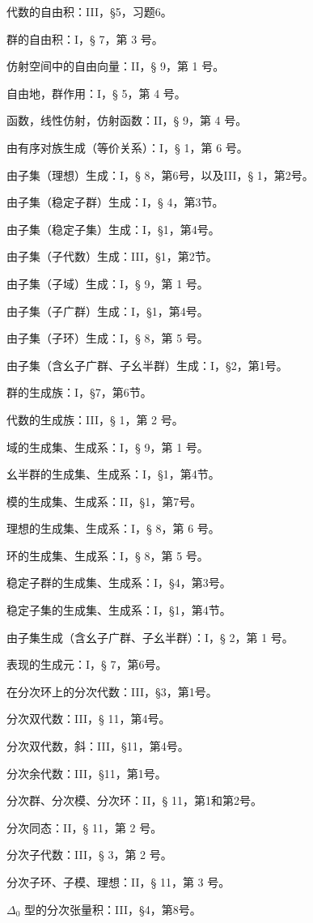 代数的自由积：III，§5，习题6。

群的自由积：I，§ 7，第 3 号。

仿射空间中的自由向量：II，§ 9，第 1 号。

自由地，群作用：I，§ 5，第 4 号。

函数，线性仿射，仿射函数：II，§ 9，第 4 号。

由有序对族生成（等价关系）：I，§ 1，第 6 号。

由子集（理想）生成：I，§ 8，第6号，以及III，§ 1，第2号。

由子集（稳定子群）生成：I，§ 4，第3节。

由子集（稳定子集）生成：I，§1，第4号。

由子集（子代数）生成：III，§1，第2节。

由子集（子域）生成：I，§ 9，第 1 号。

由子集（子广群）生成：I，§1，第4号。

由子集（子环）生成：I，§ 8，第 5 号。

由子集（含幺子广群、子幺半群）生成：I，§2，第1号。

群的生成族：I，§7，第6节。

代数的生成族：III，§ 1，第 2 号。

域的生成集、生成系：I，§ 9，第 1 号。

幺半群的生成集、生成系：I，§1，第4节。

模的生成集、生成系：II，§1，第7号。

理想的生成集、生成系：I，§ 8，第 6 号。

环的生成集、生成系：I，§ 8，第 5 号。

稳定子群的生成集、生成系：I，§4，第3号。

稳定子集的生成集、生成系：I，§1，第4节。

由子集生成（含幺子广群、子幺半群）：I，§ 2，第 1 号。

表现的生成元：I，§ 7，第6号。

在分次环上的分次代数：III，§3，第1号。

分次双代数：III，§ 11，第4号。

分次双代数，斜：III，§11，第4号。

分次余代数：III，§11，第1号。

分次群、分次模、分次环：II，§ 11，第1和第2号。

分次同态：II，§ 11，第 2 号。

分次子代数：III，§ 3，第 2 号。

分次子环、子模、理想：II，§ 11，第 3 号。

 \(\Delta_0\) 型的分次张量积：III，§4，第8号。
